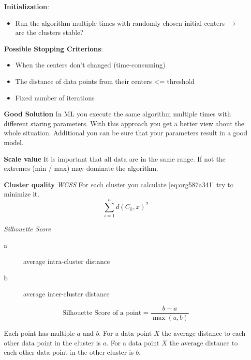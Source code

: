 \documentclass[11pt,twoside,landscape]{article}
\begin{document}
\begin{multicols}{3}
\textbf{Initialization}:
\begin{itemize}
\item Run the algorithm multiple times with randomly chosen initial centers \(\rightarrow\) are the clusters stable?
\end{itemize}


\textbf{Possible Stopping Criterions}:
\begin{itemize}
\item When the centers don't changed (time-consuming)
\item The distance of data points from their centers <= threshold
\item Fixed number of iterations
\end{itemize}


\textbf{Good Solution}
In ML you execute the same algorithm multiple times with different staring parameters.
With this approach you get a better view about the whole situation.
Additional you can be sure that your parameters result in a good model.


\textbf{Scale value}
It is important that all data are in the same range.
If not the extremes (min / max) may dominate the algorithm.


\textbf{Cluster quality}
\emph{WCSS}
For each cluster you calculate \ref{eq:org587a341} try to minimize it.
\begin{equation}
\label{eq:org587a341}
\sum_{i=1}^n d(C_k, x)^2
\end{equation}

\emph{Silhouette Score}
\begin{description}
\item[{a}] average intra-cluster distance
\item[{b}] average inter-cluster distance
\end{description}
\begin{equation}
  \text{Silhouette Score of a point} = \frac{b-a}{\max(a,b)}
\end{equation}

Each point has multiple \(a\) and \(b\).
For a data point \(X\) the average distance to each other data point in the cluster is \(a\).
For a data point \(X\) the average distance to each other data point in the other cluster is \(b\).



\end{multicols}
\end{document}
